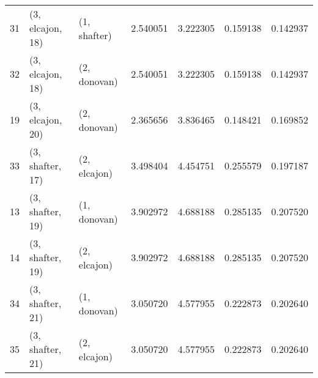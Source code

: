 \begin{tabular}{lllrrrr}
31 &  (3, elcajon, 18) &     (1, shafter) &  2.540051 &  3.222305 &   0.159138 &  0.142937 \\
32 &  (3, elcajon, 18) &     (2, donovan) &  2.540051 &  3.222305 &   0.159138 &  0.142937 \\
19 &  (3, elcajon, 20) &     (2, donovan) &  2.365656 &  3.836465 &   0.148421 &  0.169852 \\
33 &  (3, shafter, 17) &     (2, elcajon) &  3.498404 &  4.454751 &   0.255579 &  0.197187 \\
13 &  (3, shafter, 19) &     (1, donovan) &  3.902972 &  4.688188 &   0.285135 &  0.207520 \\
14 &  (3, shafter, 19) &     (2, elcajon) &  3.902972 &  4.688188 &   0.285135 &  0.207520 \\
34 &  (3, shafter, 21) &     (1, donovan) &  3.050720 &  4.577955 &   0.222873 &  0.202640 \\
35 &  (3, shafter, 21) &     (2, elcajon) &  3.050720 &  4.577955 &   0.222873 &  0.202640 \\
\bottomrule
\end{tabular}
